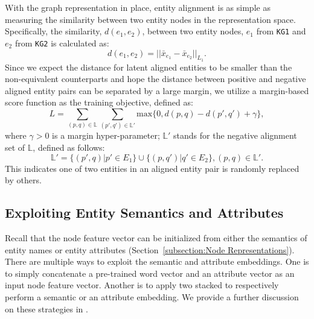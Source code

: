 With the graph representation in place, entity alignment is as simple as measuring the similarity between two entity nodes in the
representation space. Specifically, the similarity, $d(e_1,e_2)$, between two entity nodes, $e_1$ from \texttt{KG1} and $e_2$ from
\texttt{KG2} is calculated as:
	\begin{equation}
	\label{d}
	d(e_1,e_2)=||\bar{x}_{e_1}-\bar{x}_{e_2}||_{L_1}.
	\end{equation}
	Since we expect the distance for latent aligned entities to be smaller than the non-equivalent counterparts and hope the distance between positive and negative aligned entity pairs can be separated by a large margin, we utilize a margin-based score function as the training objective, defined as:
	\begin{equation}
	L=\sum\limits_{(p,q)\in \mathbb{L}}\sum\limits_{(p',q')\in \mathbb{L'}}\mathrm{max}\{0,d(p,q)-d(p',q')+\gamma\},
	\end{equation}
	where $\gamma > 0$ is a margin hyper-parameter; $\mathbb{L'}$ stands for the negative alignment set of $\mathbb{L}$, defined as follows:
	\begin{equation}
	\mathbb{L'}=\{(p',q)|p'\in E_1\}\cup\{(p,q')|q'\in E_2\}, (p,q)\in \mathbb{L'}.
	\end{equation}
	This indicates one of two entities in an aligned entity pair is randomly replaced by others.
	

	
	\subsection{Exploiting Entity Semantics and Attributes\label{sec:combine}}
    Recall that the node feature vector can be initialized from either the semantics of entity names  or entity attributes (Section~\ref{subsection:Node
    Representations}). There are multiple ways to exploit the semantic and attribute embeddings. One is to simply concatenate a pre-trained word vector
    and an attribute vector as an input node feature vector. Another is to apply two stacked \HRGCNs to respectively perform a
    semantic or an attribute embedding.  We provide a further discussion on these strategies in .


